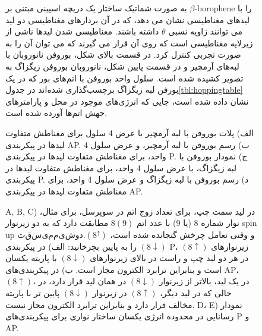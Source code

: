 \begin{figure}
\caption{به صورت شماتیک ساختار یک دریچه اسپینی مبتنی بر $\beta$-borophene را با لیدهای مغناطیسی نشان می دهد، که در آن بردارهای مغناطیسی دو لید می توانند زاویه نسبی $\theta$ داشته باشند. مغناطیسی شدن لیدها ناشی از زیرلایه مغناطیسی است که روی آن قرار می گیرند که می توان آن را به صورت تجربی کنترل کرد. در قسمت بالای شکل، بوروفن نانوروبان با لبه‌های آرمچیر و در قسمت پایین شکل، نانوروبان بوروفن زیگزاگ به تصویر کشیده شده است. سلول واحد بوروفن با اتم‌های بور که در یک بورفن لبه زیگزاگ برچسب‌گذاری شده‌اند در جدول\ref{tbl:hoppingtable} نشان داده شده است، جایی که انرژی‌های موجود در محل و پارامترهای جهش اتم‌ها آورده شده است.}
  \label{fig:model}
\end{figure}
    
\begin{figure}[!ht]
  \begin{latin}
  \centering
  \resizebox{0.45\textwidth}{!}{}
  \resizebox{0.45\textwidth}{!}{}
  \resizebox{0.45\textwidth}{!}{}
  \resizebox{0.45\textwidth}{!}{}  
  \end{latin}
\caption{الف) پلات بوروفن با لبه آرمچیر با عرض 4 سلول برای مغناطش متفاوت لیدها در پیکربندی AP. ب) رسم بوروفن با لبه آرمچیر، و عرض سلول 4 واحد، برای مغناطش متفاوت لیدها در پیکربندی P. ج) نمودار بوروفن با لبه زیگزاگ، با عرض سلول 4 واحد، برای مغناطش متفاوت لیدها در پیکربندی P. د) رسم بوروفن با لبه زیگزاگ و عرض سلول 4 واحد، برای مغناطش متفاوت لیدها در پیکربندی AP.}
\label{fig:conductance}
\end{figure}
\begin{figure}[!ht]
  \begin{latin}
    \centering
    \resizebox{0.32\textwidth}{!}{}
    \resizebox{0.32\textwidth}{!}{}
    \resizebox{0.32\textwidth}{!}{}
    \resizebox{0.45\textwidth}{!}{}
    \resizebox{0.45\textwidth}{!}{}
  \end{latin}
\caption{A, B, C) در لید سمت چپ، برای تعداد زوج اتم در سوپرسل، برای مثال، نوار شماره 8 (یا 9) با عدد اتم $8(9)$ مطابقت دارد که به دو زیر‌نوار spin up $ تقسیم می شود. (8^\uparrow)$ و وقتی تعامل چرخش گنجانده شده است، $(8\downarrow)$ را به پایین بچرخانید: الف) در پیکربندی P، زیر‌نوارهای $(8\uparrow)$ در هر دو لید چپ و راست در بالای زیر‌نوارهای $(8\downarrow)$ با پاریته یکسان است و بنابراین ترابرد الکترون مجاز است. ب) در پیکربندی‌های AP، $(8\uparrow)$، در یک لید، بالاتر از زیر‌نوار $(8\downarrow)$ در همان لید قرار دارد، در حالی که در لید دیگر، $(8\uparrow) $ در زیر‌نوار $(8\downarrow)$ پایین تر با پاریته مخالف قرار دارد و بنابراین ترابرد الکترون مجاز نیست. D، E) نمودار رسانایی در محدوده انرژی یکسان ساختار نواری برای پیکربندی‌های P و AP.}
\label{fig:bandconductance}
\end{figure}

